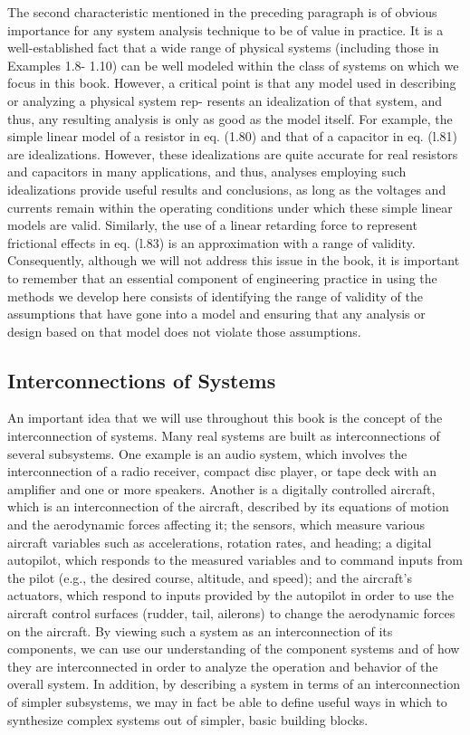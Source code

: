 \documentclass{report}
\begin{document}
The second characteristic mentioned in the preceding paragraph is of obvious importance for any system analysis technique to be of value in practice.
It is a well-established fact that a wide range of physical systems (including those in Examples 1.8- 1.10) can be well modeled within the class
of systems on which we focus in this book. However, a critical point is that any model used in describing or analyzing a physical system rep- resents
an idealization of that system, and thus, any resulting analysis is only as good as the model itself. For example, the simple linear model of a resistor
in eq. (1.80) and that of a capacitor in eq. (l.81) are idealizations. However, these idealizations are quite accurate for real resistors and capacitors
in many applications, and thus, analyses employing such idealizations provide useful results and conclusions, as long as the voltages and currents
remain within the operating conditions under which these simple linear models are valid. Similarly, the use of a linear retarding force to represent
frictional effects in eq. (l.83) is an approximation with a range of validity. Consequently, although we will not address this issue in the book,
it is important to remember that an essential component of engineering practice in using the methods we develop here consists of identifying the
range of validity of the assumptions that have gone into a model and ensuring that any analysis or design based on that model does not violate those
assumptions.

\subsection*{Interconnections of Systems}

An important idea that we will use throughout this book is the concept of the interconnection of systems. Many real systems are built as interconnections
of several subsystems. One example is an audio system, which involves the interconnection of a radio receiver, compact disc player, or tape deck
with an amplifier and one or more speakers. Another is a digitally controlled aircraft, which is an interconnection of the aircraft, described by
its equations of motion and the aerodynamic forces affecting it; the sensors, which measure various aircraft variables such as accelerations, rotation
rates, and heading; a digital autopilot, which responds to the measured variables and to command inputs from the pilot (e.g., the desired course,
altitude, and speed); and the aircraft{'}s actuators, which respond to inputs provided by the autopilot in order to use the aircraft control surfaces
(rudder, tail, ailerons) to change the aerodynamic forces on the aircraft. By viewing such a system as an interconnection of its components, we can
use our understanding of the component systems and of how they are interconnected in order to analyze the operation and behavior of the overall system.
In addition, by describing a system in terms of an interconnection of simpler subsystems, we may in fact be able to define useful ways in which to
synthesize complex systems out of simpler, basic building blocks.
\end{document}
